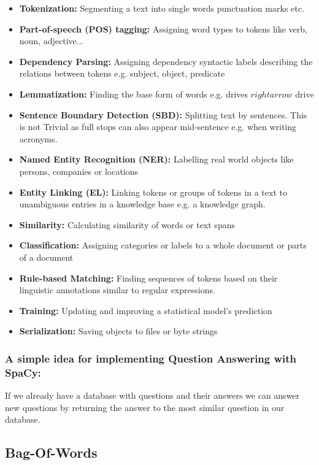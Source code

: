 \begin{itemize}
    \item \textbf{Tokenization:} Segmenting a text into single words punctuation marks etc.
    \item \textbf{Part-of-speech (POS) tagging:} Assigning word types to tokens like verb, noun, adjective...
    \item \textbf{Dependency Parsing:} Assigning dependency syntactic labels describing the relations between tokens e.g. subject, object, predicate
    \item \textbf{Lemmatization:} Finding the base form of words e.g. drives $rightarrow$ drive
    \item \textbf{Sentence Boundary Detection (SBD):} Splitting text by sentences. This is not Trivial as full stops can also appear mid-sentence e.g. when writing acronyms.
    \item \textbf{Named Entity Recognition (NER):} Labelling real world objects like persons, companies or locations
    \item \textbf{Entity Linking (EL):} Linking tokens or groups of tokens in a text to unambiguous entries in a knowledge base e.g. a knowledge graph.
    \item \textbf{Similarity:} Calculating similarity of words or text spans
    \item \textbf{Classification:} Assigning categories or labels to a whole document or parts of a document
    \item \textbf{Rule-based Matching:} Finding sequences of tokens based on their linguistic annotations similar to regular expressions.
    \item \textbf{Training:} Updating and improving a statistical model's prediction
    \item \textbf{Serialization:} Saving objects to files or byte strings
\end{itemize}

\subsubsection*{A simple idea for implementing Question Answering with SpaCy:}
If we already have a database with questions and their answers we can answer new questions by returning the answer to the most similar question in our database.

\subsection{Bag-Of-Words}

